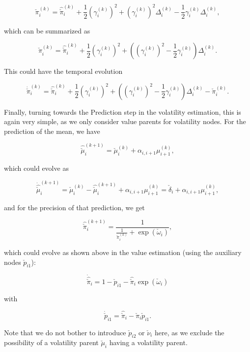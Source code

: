 \begin{equation}
	\check{\pi}_i^{(k)} = \hat{\check{\pi}}_i^{(k)} + \frac{1}{2} (\gamma_i^{(k)})^2 + (\gamma_i^{(k)})^2 \Delta_i^{(k)} - \frac{1}{2} \gamma_i^{(k)} \Delta_i^{(k)}, 
\end{equation}

which can be summarized as 

\begin{equation}
	\check{\pi}_i^{(k)} = \hat{\check{\pi}}_i^{(k)} + \frac{1}{2} (\gamma_i^{(k)})^2 + ((\gamma_i^{(k)})^2 - \frac{1}{2} \gamma_i^{(k)}) \Delta_i^{(k)}.
\end{equation}

This could have the temporal evolution

\begin{equation}
	\dot{\check{\pi}}_i^{(k)} = \hat{\check{\pi}}_i^{(k)} + \frac{1}{2} (\gamma_i^{(k)})^2 + ((\gamma_i^{(k)})^2 - \frac{1}{2} \gamma_i^{(k)}) \Delta_i^{(k)} - \check{\pi}_i^{(k)}.
\end{equation}

Finally, turning towards the \textsf{Prediction} step in the volatility estimation, this is again very simple, as we only consider value parents for volatility nodes. For the prediction of the mean, we have

\begin{equation}
	\hat{\check{\mu}}_i^{(k+1)} = \check{\mu}_i^{(k)} + \alpha_{i,i+1} \mu_{i+1}^{(k)}, 
\end{equation}

which could evolve as 

\begin{equation}
	\dot{\hat{\check{\mu}}}_i^{(k+1)} = \check{\mu}_i^{(k)} - \hat{\check{\mu}}_i^{(k+1)} + \alpha_{i,i+1} \mu_{i+1}^{(k)} = \check{\delta}_i + \alpha_{i,i+1} \mu_{i+1}^{(k)}, 
\end{equation}

and for the precision of that prediction, we get

\begin{equation}
  \hat{\check{\pi}}_i^{(k+1)} = \frac{1}{\frac{1}{\check{\pi}_i^{(k)}} + \exp(\check{\omega}_i)}, 
\end{equation}

which could evolve as shown above in the value estimation (using the auxiliary nodes $\check{p}_{i1}$):

\begin{equation}
	\dot{\hat{\check{\pi}}}_i = 1 - \check{p}_{i1} - \hat{\check{\pi}}_i \exp(\check{\omega}_i)
\end{equation}

with

\begin{equation}
	\dot{\check{p}}_{i1} = \hat{\check{\pi}}_i - \check{\pi}_i \check{p}_{i1}. 
\end{equation}

Note that we do not bother to introduce $\check{p}_{i2}$ or $\check{\nu}_i$ here, as we exclude the possibility of a volatility parent $\check{\mu}_i$ having a volatility parent.